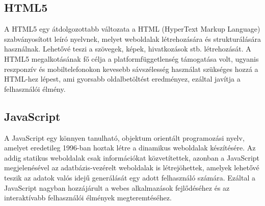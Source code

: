 \documentclass[12pt, a4paper]{report}
\theoremstyle{definition}
\begin{document}
	\subsection{HTML5}
	A HTML5 egy átdolgozottabb változata a HTML (HyperText Markup Language) szabványosított leíró nyelvnek, melyet weboldalak létrehozására és strukturálására használnak. Lehetővé teszi a szövegek, képek, hivatkozások stb. létrehozását. A HTML5 megalkotásának fő célja a platformfüggetlenség támogatása volt, ugyanis reszponzív és mobiltelefonokon kevesebb sávszélesség használat szükséges hozzá a HTML-hez lépest, ami gyorsabb oldalbetöltést eredményez, ezáltal javítja a felhasználói élmény.
	
	\subsection{JavaScript}
	A JavaScript egy könnyen tanulható, objektum orientált programozási nyelv, amelyet eredetileg 1996-ban hoztak létre a dinamikus weboldalak készítésére. Az addig statikus weboldalak csak információkat közvetítettek, azonban a JavaScript megjelenésével az adatbázis-vezérelt weboldalak is létrejöhettek, amelyek lehetővé teszik az adatok valós idejű generálását egy adott felhasználó számára. Ezáltal a JavaScript nagyban hozzájárult a webes alkalmazások fejlődéséhez és az interaktívabb felhasználói élmények megteremtéséhez.
	
\end{document}
